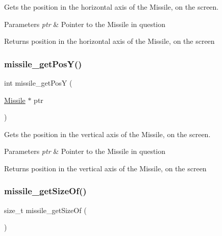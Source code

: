 Gets the position in the horizontal axis of the Missile, on the screen. 


\begin{DoxyParams}{Parameters}
{\em ptr} & Pointer to the Missile in question\\
\hline
\end{DoxyParams}
\begin{DoxyReturn}{Returns}
position in the horizontal axis of the Missile, on the screen 
\end{DoxyReturn}
\hypertarget{group___missile_gaef773d140afb584ac01d494d0f7c02e8}{}\label{group___missile_gaef773d140afb584ac01d494d0f7c02e8} 
\subsubsection{\texorpdfstring{missile\+\_\+get\+Pos\+Y()}{missile\_getPosY()}}
{\footnotesize\ttfamily int missile\+\_\+get\+PosY (\begin{DoxyParamCaption}\item[{\hyperlink{group___missile_ga7ea98f7c879356e5dfa41934529d86e1}{Missile} $\ast$}]{ptr }\end{DoxyParamCaption})}



Gets the position in the vertical axis of the Missile, on the screen. 


\begin{DoxyParams}{Parameters}
{\em ptr} & Pointer to the Missile in question\\
\hline
\end{DoxyParams}
\begin{DoxyReturn}{Returns}
position in the vertical axis of the Missile, on the screen 
\end{DoxyReturn}
\hypertarget{group___missile_gad5e9a748d3bf909e91ceef47f63ee0d4}{}\label{group___missile_gad5e9a748d3bf909e91ceef47f63ee0d4} 
\subsubsection{\texorpdfstring{missile\+\_\+get\+Size\+Of()}{missile\_getSizeOf()}}
{\footnotesize\ttfamily size\+\_\+t missile\+\_\+get\+Size\+Of (\begin{DoxyParamCaption}{ }\end{DoxyParamCaption})}



